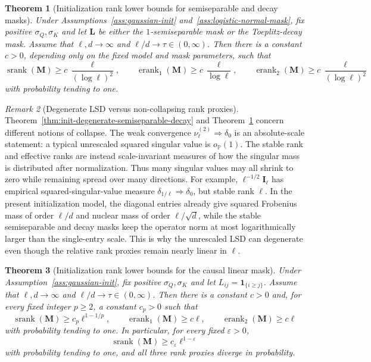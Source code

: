 \documentclass{article}
\newcommand{\Prob}{\mathbb{P}}
\newcommand{\srank}{\operatorname{srank}}
\newcommand{\erank}{\operatorname{erank}}
\newcommand{\weak}{\Rightarrow}
\newcommand{\one}{\mathbf{1}}
\newcommand{\bM}{\mathbf{M}}
\newcommand{\bL}{\mathbf{L}}
\newtheorem{theorem}{Theorem}
\theoremstyle{definition}
\theoremstyle{remark}
\newtheorem{remark}[theorem]{Remark}
\begin{document}
\begin{theorem}[Initialization rank lower bounds for semiseparable and decay masks]
\label{thm:init-semiseparable-decay-rank-lower-bounds}
Under Assumptions~\ref{ass:gaussian-init}
and~\ref{ass:logistic-normal-mask}, fix positive $\sigma_Q,\sigma_K$ and let $\bL$
be either the $1$-semiseparable mask or the Toeplitz-decay mask.  Assume that
$\ell,d\to\infty$ and $\ell/d\to\tau\in(0,\infty)$.
Then there is a constant $c>0$, depending only on the fixed model and mask
parameters, such that
\[
    \srank(\bM)
    \geq
    c\,\frac{\ell}{(\log\ell)^2},
    \qquad
    \erank_{1}(\bM)
    \geq
    c\,\frac{\ell}{\log\ell},
    \qquad
    \erank_{2}(\bM)
    \geq
    c\,\frac{\ell}{(\log\ell)^2}
\]
with probability tending to one.
\end{theorem}


\begin{remark}[Degenerate LSD versus non-collapsing rank proxies]
Theorem~\ref{thm:init-degenerate-semiseparable-decay} and
Theorem~\ref{thm:init-semiseparable-decay-rank-lower-bounds} concern different
notions of collapse.  The weak convergence
$\nu_{\ell}^{(2)}\weak\delta_0$ is an absolute-scale statement: a typical
unrescaled squared singular value is $o_{\Prob}(1)$.  The stable rank and
effective ranks are instead scale-invariant measures of how the singular mass is
distributed after normalization.  Thus many singular values may all shrink to
zero while remaining spread over many directions.  For example,
$\ell^{-1/2}\mathbf I_\ell$ has empirical squared-singular-value measure
$\delta_{1/\ell}\weak\delta_0$, but stable rank $\ell$.  In the present
initialization model, the diagonal entries already give squared Frobenius mass
of order $\ell/d$ and nuclear mass of order $\ell/\sqrt d$, while the stable
semiseparable and decay masks keep the operator norm at most logarithmically
larger than the single-entry scale.  This is why the unrescaled LSD can degenerate even though
the relative rank proxies remain nearly linear in $\ell$.
\end{remark}


\begin{theorem}[Initialization rank lower bounds for the causal linear mask]
\label{thm:init-causal-linear-rank-lower-bounds}
Under Assumption~\ref{ass:gaussian-init}, fix positive $\sigma_Q,\sigma_K$ and
let $L_{ij}=\one_{\{i\geq j\}}$.  Assume that $\ell,d\to\infty$ and
$\ell/d\to\tau\in(0,\infty)$.  Then there is a constant $c>0$ and, for every
fixed integer $p\geq2$, a constant $c_p>0$ such that
\[
    \srank(\bM)
    \geq
    c_p\ell^{1-1/p},
    \qquad
    \erank_{1}(\bM)
    \geq
    c\ell,
    \qquad
    \erank_{2}(\bM)
    \geq
    c\ell
    \label{eq:init-causal-linear-rank-lower-bounds}
\]
with probability tending to one.  In particular, for every fixed
$\varepsilon>0$,
\[
    \srank(\bM)
    \geq
    c_{\varepsilon}\ell^{1-\varepsilon}
\]
with probability tending to one, and all three rank proxies diverge in
probability.
\end{theorem}
\end{document}
